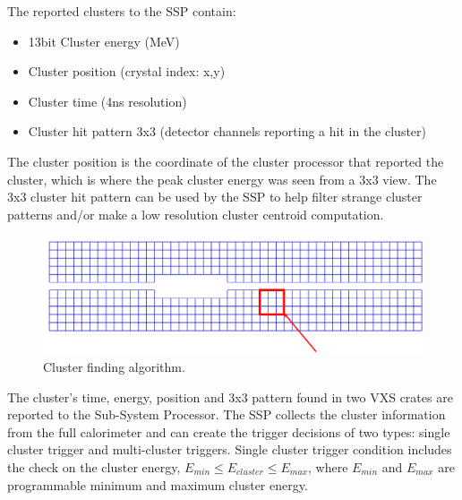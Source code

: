 The reported clusters to the SSP contain:

\begin{itemize}
\item 13bit Cluster energy (MeV)
\item Cluster position (crystal index: x,y)
\item Cluster time (4ns resolution)
\item Cluster hit pattern 3x3 (detector channels reporting a hit in the cluster)
\end{itemize}

The cluster position is the coordinate of the cluster processor that reported the cluster, which is where the peak cluster energy was seen from a 3x3 view. The 3x3 cluster hit pattern can be used by the SSP to help filter strange cluster patterns and/or make a low resolution cluster centroid computation.

\begin{figure}[h]
\includegraphics[scale=0.4]{daq_trigger/figures/hps_trigger_3x3}
\caption{\small{Cluster finding algorithm.}}
\label{fig:hps_trigger_3x3}
\end{figure}





The cluster's time, energy, position and 3x3 pattern found in two VXS crates are reported to the Sub-System Processor. 
The SSP collects the cluster information from the full calorimeter and can create the trigger decisions of two types:
single cluster trigger and multi-cluster triggers.
Single cluster trigger condition includes the check on the cluster energy, $E_{min}\le E_{cluster}\le E_{max}$, where $E_{min}$ and $E_{max}$ are programmable minimum and maximum cluster energy.

